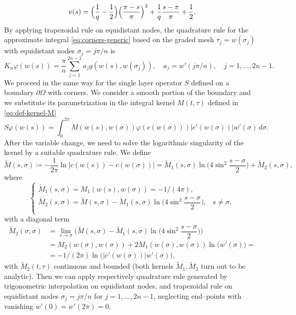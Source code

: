 \documentclass[10pt, a4paper, twoside, openright]{book}
\theoremstyle{definition}
\theoremstyle{plain}
\theoremstyle{plain}
\theoremstyle{plain}
\theoremstyle{plain}
\theoremstyle{plain}
\theoremstyle{plain}
\theoremstyle{plain}
\theoremstyle{plain}
\let\phi\varphi
\begin{document}
\begin{equation}
 v(s)=\Bigl(\frac{1}{q} - \frac{1}{2}\Bigr)\Bigl(\frac{\pi - s}{\pi}\Bigr)^3 + \frac{1}{q}\frac{s-\pi}{\pi} + \frac{1}{2}.
\end{equation}
By applying trapezoidal rule on equidistant nodes, the quadrature rule for the approximate integral \eqref{eq:corners-generic} based on the graded mesh $\tau_j=w(\sigma_j)$ 
with equidistant nodes $\sigma_j=j\pi/n$ is 
\begin{equation}
 K_n\phi(w(s))=\frac{\pi}{n}\sum_{j=1}^{2n-1}a_jg(w(s), w(\sigma_j)),\quad a_j=w'(j\pi/n),\quad j=1,\dots,2n-1.
\end{equation}
We proceed in the same way for the single layer operator $S$ defined on a boundary $\partial \Omega$ with corners. 
We consider a smooth portion of the boundary and we substitute its parametrization in the integral kernel $M(t,\tau)$ defined in \eqref{eq:def-kernel-M}
\begin{equation}
 S\phi(w(s))=\int_0^{2\pi}M(w(s),w(\sigma))\phi(c(w(\sigma)))|c'(w(\sigma))|w'(\sigma)\,d\sigma.
\end{equation}
After the variable change, we need to solve the logarithmic singularity of the kernel by a suitable quadrature rule.
We define
\begin{equation}
\label{eq:def-kernel-tildeM}
 \tilde{M}(s,\sigma)\coloneqq-\frac{1}{2\pi}\ln|c(w(s))-c(w(\sigma))|=\tilde{M}_1(s,\sigma)\ln\Big(4\sin^2\frac{s - \sigma}{2}\Big)+\tilde{M}_2(s,\sigma),
\end{equation}
where
\begin{equation}
\begin{cases}
 \tilde{M}_1(s,\sigma) = M_1(w(s),w(\sigma))= -1/(4\pi), \\
 \tilde{M}_2(s,\sigma) = \tilde{M}(s,\sigma) - \tilde{M}_1(s,\sigma)\ln\Big(4\sin^2\dfrac{s - \sigma}{2}\Big), & s\neq \sigma, \\
\end{cases}
\end{equation}
with a diagonal term
\begin{align}
 \tilde{M}_2(\sigma,\sigma)&=\lim_{s\to\sigma} \Big(\tilde{M}(s,\sigma) - \tilde{M}_1(s,\sigma)\ln\Big(4\sin^2\dfrac{s - \sigma}{2}\Big)\Big) \\
 &=M_2(w(\sigma),w(\sigma)) + 2M_1(w(\sigma),w(\sigma))\ln\big(w'(\sigma)\big)= \\
 &=-1/(2\pi)\ln\big(|c'(w(\sigma))|w'(\sigma)\big),
\end{align}
with $\tilde{M}_2(t,\tau)$ continuous and bounded (both kernels $\tilde{M}_1, \tilde{M}_2$ turn out to be analytic). 
Then we can apply respectively quadrature rule generated by trigonometric interpolation on equidistant nodes, and trapezoidal rule on equidistant nodes $\sigma_j = j\pi/n$ for $j=1,\dots,2n-1$, neglecting end--points with vanishing $w'(0)=w'(2\pi)=0$.
\end{document}
